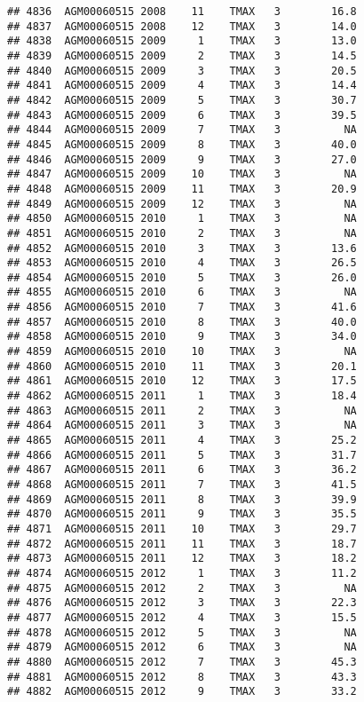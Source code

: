\documentclass{article}\usepackage[]{graphicx}\usepackage[]{color}
\makeatletter
\newenvironment{kframe}{%
 \def\at@end@of@kframe{}%
 \ifinner\ifhmode%
  \def\at@end@of@kframe{\end{minipage}}%
  \begin{minipage}{\columnwidth}%
 \fi\fi%
 \def\FrameCommand##1{\hskip\@totalleftmargin \hskip-\fboxsep
 \colorbox{shadecolor}{##1}\hskip-\fboxsep
     \hskip-\linewidth \hskip-\@totalleftmargin \hskip\columnwidth}%
 \MakeFramed {\advance\hsize-\width
   \@totalleftmargin\z@ \linewidth\hsize
   \@setminipage}}%
 {\par\unskip\endMakeFramed%
 \at@end@of@kframe}
\newenvironment{knitrout}{}{} %
\makeatother
\begin{document}
\begin{knitrout}
\begin{kframe}
\begin{verbatim}
## 4836  AGM00060515 2008    11    TMAX   3        16.8
## 4837  AGM00060515 2008    12    TMAX   3        14.0
## 4838  AGM00060515 2009     1    TMAX   3        13.0
## 4839  AGM00060515 2009     2    TMAX   3        14.5
## 4840  AGM00060515 2009     3    TMAX   3        20.5
## 4841  AGM00060515 2009     4    TMAX   3        14.4
## 4842  AGM00060515 2009     5    TMAX   3        30.7
## 4843  AGM00060515 2009     6    TMAX   3        39.5
## 4844  AGM00060515 2009     7    TMAX   3          NA
## 4845  AGM00060515 2009     8    TMAX   3        40.0
## 4846  AGM00060515 2009     9    TMAX   3        27.0
## 4847  AGM00060515 2009    10    TMAX   3          NA
## 4848  AGM00060515 2009    11    TMAX   3        20.9
## 4849  AGM00060515 2009    12    TMAX   3          NA
## 4850  AGM00060515 2010     1    TMAX   3          NA
## 4851  AGM00060515 2010     2    TMAX   3          NA
## 4852  AGM00060515 2010     3    TMAX   3        13.6
## 4853  AGM00060515 2010     4    TMAX   3        26.5
## 4854  AGM00060515 2010     5    TMAX   3        26.0
## 4855  AGM00060515 2010     6    TMAX   3          NA
## 4856  AGM00060515 2010     7    TMAX   3        41.6
## 4857  AGM00060515 2010     8    TMAX   3        40.0
## 4858  AGM00060515 2010     9    TMAX   3        34.0
## 4859  AGM00060515 2010    10    TMAX   3          NA
## 4860  AGM00060515 2010    11    TMAX   3        20.1
## 4861  AGM00060515 2010    12    TMAX   3        17.5
## 4862  AGM00060515 2011     1    TMAX   3        18.4
## 4863  AGM00060515 2011     2    TMAX   3          NA
## 4864  AGM00060515 2011     3    TMAX   3          NA
## 4865  AGM00060515 2011     4    TMAX   3        25.2
## 4866  AGM00060515 2011     5    TMAX   3        31.7
## 4867  AGM00060515 2011     6    TMAX   3        36.2
## 4868  AGM00060515 2011     7    TMAX   3        41.5
## 4869  AGM00060515 2011     8    TMAX   3        39.9
## 4870  AGM00060515 2011     9    TMAX   3        35.5
## 4871  AGM00060515 2011    10    TMAX   3        29.7
## 4872  AGM00060515 2011    11    TMAX   3        18.7
## 4873  AGM00060515 2011    12    TMAX   3        18.2
## 4874  AGM00060515 2012     1    TMAX   3        11.2
## 4875  AGM00060515 2012     2    TMAX   3          NA
## 4876  AGM00060515 2012     3    TMAX   3        22.3
## 4877  AGM00060515 2012     4    TMAX   3        15.5
## 4878  AGM00060515 2012     5    TMAX   3          NA
## 4879  AGM00060515 2012     6    TMAX   3          NA
## 4880  AGM00060515 2012     7    TMAX   3        45.3
## 4881  AGM00060515 2012     8    TMAX   3        43.3
## 4882  AGM00060515 2012     9    TMAX   3        33.2

\end{verbatim}
\end{kframe}
\end{knitrout}
\end{document}
